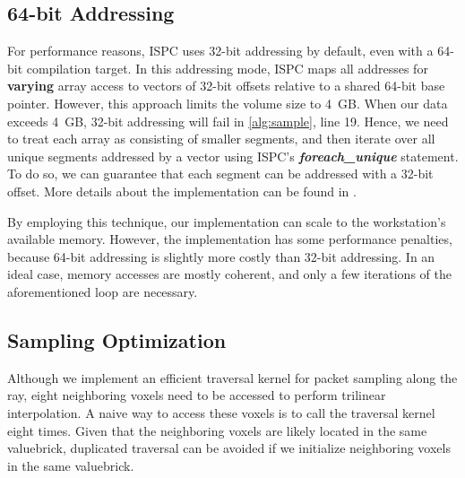 \subsection{64-bit Addressing} 
For performance reasons, ISPC uses 32-bit addressing by default, even with
a 64-bit compilation target. In this addressing mode, ISPC maps all addresses for
\textbf{varying} array access to vectors of 32-bit offsets relative to a shared
64-bit base pointer. However, this approach limits the volume size to 4~GB.
When our data exceeds 4~GB, 32-bit addressing will fail in \cref{alg:sample},
line 19. Hence, we need to treat each array as consisting of smaller
segments, and then iterate over all unique segments addressed by a vector using
ISPC's \textbf{\textit{foreach\_unique}} statement. To do so, we can guarantee 
that each segment can be addressed with a 32-bit offset. More details about
the implementation can be found in \cite{wald_2018}. 

By employing this technique, our implementation can scale to the workstation's available
memory. However, the implementation has some performance penalties, because 64-bit addressing is slightly more costly than 32-bit addressing. In an ideal case, memory accesses are mostly coherent, and only a few iterations of the aforementioned loop are necessary. 


\subsection{Sampling Optimization}
Although we implement an efficient traversal kernel for packet sampling along the ray,
eight neighboring voxels need to be accessed to perform trilinear interpolation.
A naive way to access these voxels is to call the traversal kernel eight
times. Given that the neighboring voxels are likely located in the same valuebrick,
duplicated traversal can be avoided if we initialize neighboring voxels in the same
valuebrick. 

